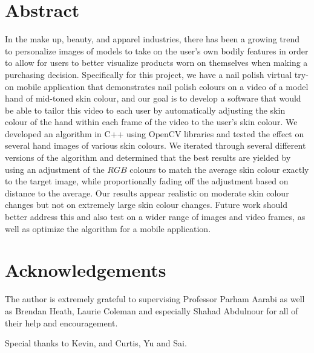 \documentclass[12pt, a4paper]{article}
\begin{document}


\renewcommand{\thepage}{\roman{page}}%
\setcounter{page}{1}

\begin{spacing}{1}
\section*{Abstract}
In the make up, beauty, and apparel industries, there has been a growing trend to personalize images of models to take on the user's own bodily features in order to allow for users to better visualize products worn on themselves when making a purchasing decision. Specifically for this project, we have a nail polish virtual try-on mobile application that demonstrates nail polish colours on a video of a model hand of mid-toned skin colour, and our goal is to develop a software that would be able to tailor this video to each user by automatically adjusting the skin colour of the hand within each frame of the video to the user's skin colour. We developed an algorithm in C++ using OpenCV libraries and tested the effect on several hand images of various skin colours. We iterated through several different versions of the algorithm and determined that the best results are yielded by using an adjustment of the $RGB$ colours to match the average skin colour exactly to the target image, while proportionally fading off the adjustment based on distance to the average. Our results appear realistic on moderate skin colour changes but not on extremely large skin colour changes. Future work should better address this and also test on a wider range of images and video frames, as well as optimize the algorithm for a mobile application.

\pagebreak

\section*{Acknowledgements}
The author is extremely grateful to supervising Professor Parham Aarabi as well as Brendan Heath, Laurie Coleman and especially Shahad Abdulnour for all of their help and encouragement.

Special thanks to Kevin, and Curtis, Yu and Sai.
\pagebreak
\end{spacing}

\tableofcontents
\pagebreak

\listoffigures
\listoftables
\pagebreak

\renewcommand{\nomname}{List of Symbols}
\printnomenclature
\pagebreak
\end{document}
